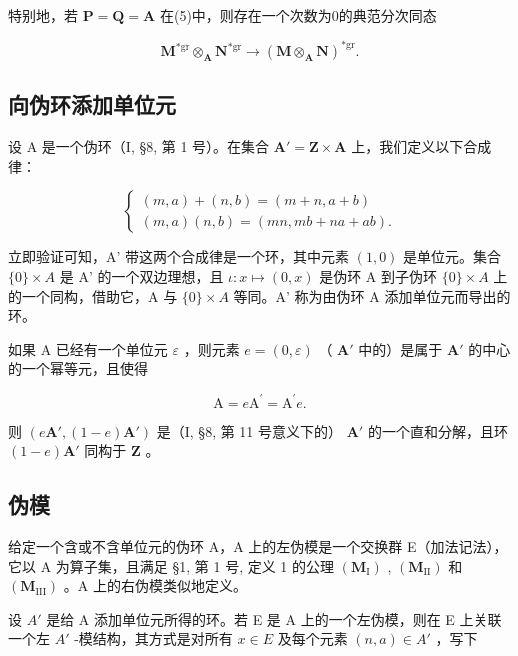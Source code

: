 特别地，若 \(\mathbf{P} = \mathbf{Q} = \mathbf{A}\) 在(5)中，则存在一个次数为0的典范分次同态

\[
\mathbf {M} ^ {* \mathrm{gr}} \otimes_ {\mathbf {A}} \mathbf {N} ^ {* \mathrm{gr}} \rightarrow (\mathbf {M} \otimes_ {\mathbf {A}} \mathbf {N}) ^ {* \mathrm{gr}}.\tag{6}
\]


\subsection{向伪环添加单位元}

设 A 是一个伪环（I, §8, 第 1 号）。在集合 \(\mathbf{A}' = \mathbf{Z} \times \mathbf{A}\) 上，我们定义以下合成律：

\[
\left\{ \begin{array}{l} (m, a) + (n, b) = (m + n, a + b) \\ (m, a) (n, b) = (m n, m b + n a + a b). \end{array} \right.\tag{1}
\]

立即验证可知，A' 带这两个合成律是一个环，其中元素 \((1,0)\) 是单位元。集合 \(\{0\} \times A\) 是 A' 的一个双边理想，且 \(\iota: x \mapsto (0, x)\) 是伪环 A 到子伪环 \(\{0\} \times A\) 上的一个同构，借助它，A 与 \(\{0\} \times A\) 等同。A' 称为由伪环 A 添加单位元而导出的环。

如果 A 已经有一个单位元 \(\varepsilon\) ，则元素 \(e = (0, \varepsilon)\) （ \(\mathbf{A}'\) 中的）是属于 \(\mathbf{A}'\) 的中心的一个幂等元，且使得

\[
\mathrm{A} = e \mathrm{A} ^ {\prime} = \mathrm{A} ^ {\prime} e.
\]

则 \((e\mathbf{A}', (1 - e)\mathbf{A}')\) 是（I, §8, 第 11 号意义下的） \(\mathbf{A}'\) 的一个直和分解，且环 \((1 - e)\mathbf{A}'\) 同构于 \(\mathbf{Z}\) 。

\subsection{伪模}

给定一个含或不含单位元的伪环 A，A 上的左伪模是一个交换群 E（加法记法），它以 A 为算子集，且满足 §1, 第 1 号, 定义 1 的公理 \((\mathbf{M}_{\mathrm{I}})\) , \((\mathbf{M}_{\mathrm{II}})\) 和 \((\mathbf{M}_{\mathrm{III}})\) 。A 上的右伪模类似地定义。

设 \(A'\) 是给 A 添加单位元所得的环。若 E 是 A 上的一个左伪模，则在 E 上关联一个左 \(A'\) -模结构，其方式是对所有 \(x \in E\) 及每个元素 \((n, a) \in A'\) ，写下


